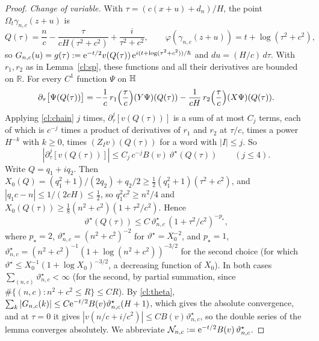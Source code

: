 \begin{proof}
\emph{Change of variable.} With $\tau=(c(x+u)+d_n)/H$, the point $\Omega_t\gamma_{n,c}(z+u)$ is
\[
Q(\tau)=\frac nc-\frac{\tau}{cH(\tau^2+c^2)}+\frac{i}{\tau^2+c^2},\qquad \varphi(\gamma_{n,c}(z+u))=t+\log(\tau^2+c^2),
\]
so $G_{n,c}(u)=g(\tau):=\mathrm{e}^{-t/2}v(Q(\tau))\,\mathrm{e}^{i(t+\log(\tau^2+c^2))/\hbar}$ and $du=(H/c)\,d\tau$. With $r_1,r_2$ as in Lemma~\ref{cl:sp}, these functions and all their derivatives are bounded on $\mathbb R$. For every $C^1$ function $\Psi$ on $\mathbb{H}$
\begin{equation}\label{cl:chain}
\partial_\tau\bigl[\Psi(Q(\tau))\bigr]=-\frac1c\,r_1\Bigl(\frac\tau c\Bigr)(Y\Psi)(Q(\tau))-\frac1{cH}\,r_2\Bigl(\frac\tau c\Bigr)(X\Psi)(Q(\tau)) .
\end{equation}
Applying \eqref{cl:chain} $j$ times, $\partial_\tau^j[v(Q(\tau))]$ is a sum of at most $C_j$ terms, each of which is $c^{-j}$ times a product of
derivatives of $r_1$ and $r_2$ at $\tau/c$, times a power $H^{-k}$ with $k\ge0$, times $(Z_Iv)(Q(\tau))$ for a word with $|I|\le j$. So
\begin{equation}\label{cl:der}
|\partial_\tau^j[v(Q(\tau))]|\le C_j\,c^{-j}B(v)\,\vartheta^\star(Q(\tau))\qquad(j\le4).
\end{equation}
Write $Q=q_1+iq_2$. Then $X_0(Q)=(q_1^2+1)/(2q_2)+q_2/2\ge\tfrac12(q_1^2+1)(\tau^2+c^2)$, and $|q_1c-n|\le1/(2cH)\le\tfrac12$, so $q_1^2c^2\ge n^2/4$ and
$X_0(Q(\tau))\ge\tfrac18(n^2+c^2)(1+\tau^2/c^2)$. Hence
\begin{equation}\label{cl:theta}
\vartheta^\star(Q(\tau))\le C\,\vartheta^\star_{n,c}\,(1+\tau^2/c^2)^{-p_\star},
\end{equation}
where $p_\star=2$, $\vartheta^\star_{n,c}=(n^2+c^2)^{-2}$ for $\vartheta^\star=X_0^{-2}$, and $p_\star=1$,
$\vartheta^\star_{n,c}=(n^2+c^2)^{-1}(1+\log(n^2+c^2))^{-3/2}$ for the second choice (for which $\vartheta^\star\le X_0^{-1}(1+\log X_0)^{-3/2}$, a decreasing
function of $X_0$). In both cases $\sum_{(n,c)}\vartheta^\star_{n,c}<\infty$ (for the second, by
partial summation, since $\#\{(n,c):n^2+c^2\le R\}\le CR$). By \eqref{cl:theta}, $\sum_k|G_{n,c}(k)|\le C\mathrm{e}^{-t/2}B(v)\vartheta^\star_{n,c}(H+1)$, which gives the
absolute convergence, and at $\tau=0$ it gives $|v(n/c+i/c^2)|\le CB(v)\vartheta^\star_{n,c}$, so the double series of the lemma converges absolutely.
We abbreviate $\mathcal N_{n,c}:=\mathrm{e}^{-t/2}B(v)\,\vartheta^\star_{n,c}$.


\end{proof}
